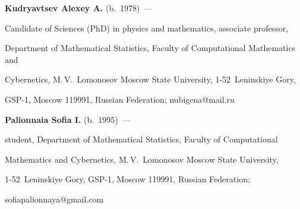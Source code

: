\Contr





\noindent


\textbf{Kudryavtsev Alexey A.} (b.\ 1978)~---


Candidate of Sciences (PhD) in physics and mathematics, associate professor, 


Department of Mathematical Statistics, Faculty of Computational Mathematics and 


Cybernetics, M.\,V.~Lomonosov Moscow State University, 1-52~Leninskiye Gory,


 GSP-1, Moscow 119991, Russian Federation; \mbox{nubigena@mail.ru}





\vspace*{3pt}





\noindent


\textbf{Palionnaia Sofia I.} (b.\ 1995)~--- 


student, Department of Mathematical Statistics, Faculty of Computational 


Mathematics and Cybernetics, M.\,V.~Lomonosov Moscow State University, 


1-52~Leninskiye Gory, GSP-1, Moscow 119991, Russian Federation; 


\mbox{sofiapalionnaya@gmail.com}


\label{end\stat}








\renewcommand{\bibname}{\protect\rm Литература}


